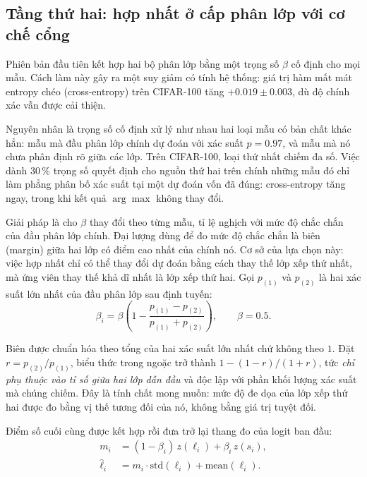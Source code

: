 \documentclass[11pt,a4paper]{article}
\begin{document}
\subsection{Tầng thứ hai: hợp nhất ở cấp phân lớp với cơ chế cổng}
\label{sec:stage2}

Phiên bản đầu tiên kết hợp hai bộ phân lớp bằng một trọng số $\beta$ cố định cho
mọi mẫu. Cách làm này gây ra một suy giảm có tính hệ thống: giá trị hàm mất mát
entropy chéo (cross-entropy) trên CIFAR-100 tăng $+0.019 \pm 0.003$, dù độ chính
xác vẫn được cải thiện.

Nguyên nhân là trọng số cố định xử lý như nhau hai loại mẫu có bản chất khác
hẳn: mẫu mà đầu phân lớp chính dự đoán với xác suất $p = 0.97$, và mẫu mà nó
chưa phân định rõ giữa các lớp. Trên CIFAR-100, loại thứ nhất chiếm đa số. Việc
dành $30\,\%$ trọng số quyết định cho nguồn thứ hai trên chính những mẫu đó chỉ
làm phẳng phân bố xác suất tại một dự đoán vốn đã đúng: cross-entropy tăng ngay,
trong khi kết quả $\arg\max$ không thay đổi.

Giải pháp là cho $\beta$ thay đổi theo từng mẫu, tỉ lệ nghịch với mức độ chắc
chắn của đầu phân lớp chính. Đại lượng dùng để đo mức độ chắc chắn là biên
(margin) giữa hai lớp có điểm cao nhất của chính nó. Cơ sở của lựa chọn này:
việc hợp nhất chỉ có thể thay đổi dự đoán bằng cách thay thế lớp xếp thứ nhất,
mà ứng viên thay thế khả dĩ nhất là lớp xếp thứ hai. Gọi $p_{(1)}$ và $p_{(2)}$
là hai xác suất lớn nhất của đầu phân lớp sau định tuyến:
\begin{equation}
\beta_i = \beta \left( 1 - \frac{p_{(1)} - p_{(2)}}{p_{(1)} + p_{(2)}} \right),
\qquad \beta = 0.5 .
\label{eq:gate}
\end{equation}

Biên được chuẩn hóa theo tổng của hai xác suất lớn nhất chứ không theo $1$. Đặt
$r = p_{(2)}/p_{(1)}$, biểu thức trong ngoặc trở thành $1 - (1-r)/(1+r)$, tức
\emph{chỉ phụ thuộc vào tỉ số giữa hai lớp dẫn đầu} và độc lập với phần khối
lượng xác suất mà chúng chiếm. Đây là tính chất mong muốn: mức độ đe dọa của lớp
xếp thứ hai được đo bằng vị thế tương đối của nó, không bằng giá trị tuyệt đối.

Điểm số cuối cùng được kết hợp rồi đưa trở lại thang đo của logit ban đầu:
\begin{align}
m_i &= (1 - \beta_i)\, z(\ell_i) + \beta_i\, z(s_i),\\
\hat{\ell}_i &= m_i \cdot \mathrm{std}(\ell_i) + \mathrm{mean}(\ell_i).
\label{eq:affine}
\end{align}
\end{document}
